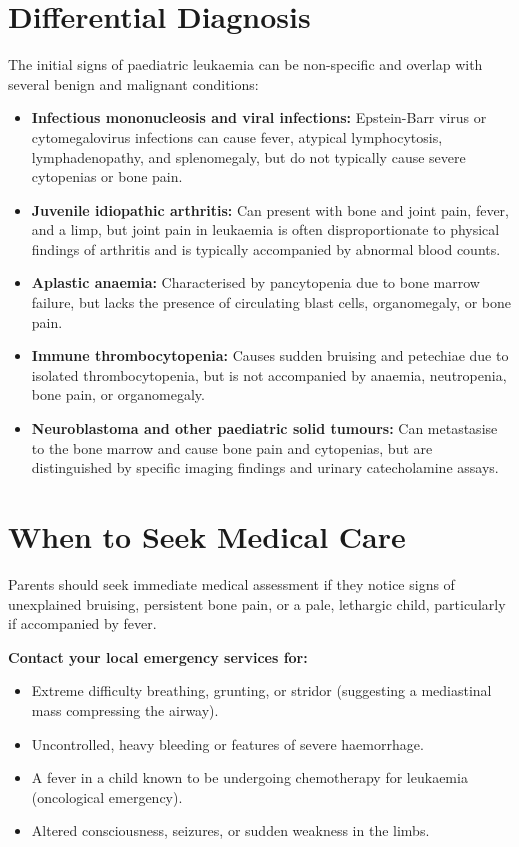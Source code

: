 \section*{Differential Diagnosis}
The initial signs of paediatric leukaemia can be non-specific and overlap with several benign and malignant conditions:
\begin{itemize}
    \item \textbf{Infectious mononucleosis and viral infections:} Epstein-Barr virus or cytomegalovirus infections can cause fever, atypical lymphocytosis, lymphadenopathy, and splenomegaly, but do not typically cause severe cytopenias or bone pain.
    \item \textbf{Juvenile idiopathic arthritis:} Can present with bone and joint pain, fever, and a limp, but joint pain in leukaemia is often disproportionate to physical findings of arthritis and is typically accompanied by abnormal blood counts.
    \item \textbf{Aplastic anaemia:} Characterised by pancytopenia due to bone marrow failure, but lacks the presence of circulating blast cells, organomegaly, or bone pain.
    \item \textbf{Immune thrombocytopenia:} Causes sudden bruising and petechiae due to isolated thrombocytopenia, but is not accompanied by anaemia, neutropenia, bone pain, or organomegaly.
    \item \textbf{Neuroblastoma and other paediatric solid tumours:} Can metastasise to the bone marrow and cause bone pain and cytopenias, but are distinguished by specific imaging findings and urinary catecholamine assays.
\end{itemize}

\section*{When to Seek Medical Care}
Parents should seek immediate medical assessment if they notice signs of unexplained bruising, persistent bone pain, or a pale, lethargic child, particularly if accompanied by fever.

\textbf{Contact your local emergency services for:}
\begin{itemize}
    \item Extreme difficulty breathing, grunting, or stridor (suggesting a mediastinal mass compressing the airway).
    \item Uncontrolled, heavy bleeding or features of severe haemorrhage.
    \item A fever in a child known to be undergoing chemotherapy for leukaemia (oncological emergency).
    \item Altered consciousness, seizures, or sudden weakness in the limbs.
\end{itemize}

